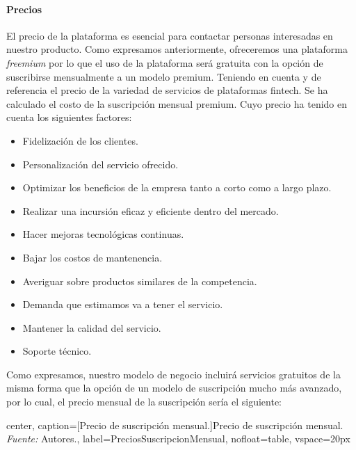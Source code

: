 \paragraph*{Precios}
El precio de la plataforma es esencial para contactar personas interesadas en nuestro producto. Como expresamos anteriormente, ofreceremos una plataforma \textit{freemium} por lo que el uso de la plataforma será gratuita con la opción de suscribirse mensualmente a un modelo premium. Teniendo en cuenta y de referencia el precio de la variedad de servicios de plataformas fintech. Se ha calculado el costo de la suscripción mensual premium. Cuyo precio ha tenido en cuenta los siguientes factores:

\begin{itemize}
	\item Fidelización de los clientes.
	
	\item Personalización del servicio ofrecido.
	
	\item Optimizar los beneficios de la empresa tanto a corto como a largo plazo.
	
	\item Realizar una incursión eficaz y eficiente dentro del mercado.
	
	\item Hacer mejoras tecnológicas continuas.
	
	\item Bajar los costos de mantenencia.
	
	\item Averiguar sobre productos similares de la competencia.
	
	\item Demanda que estimamos va a tener el servicio.
	
	\item Mantener la calidad del servicio.
	
	\item Soporte técnico.
\end{itemize}

Como expresamos, nuestro modelo de negocio incluirá servicios gratuitos de la misma forma que la opción de un modelo de suscripción mucho más avanzado, por lo cual, el precio mensual de la suscripción sería el siguiente:

\begin{adjustbox}{
		center,
		caption=[{Precio de suscripción mensual.}]{\centering Precio de suscripción mensual. \textit{Fuente:} Autores.},
		label={PreciosSuscripcionMensual},
		nofloat=table, vspace={20px}}
\end{adjustbox}	
